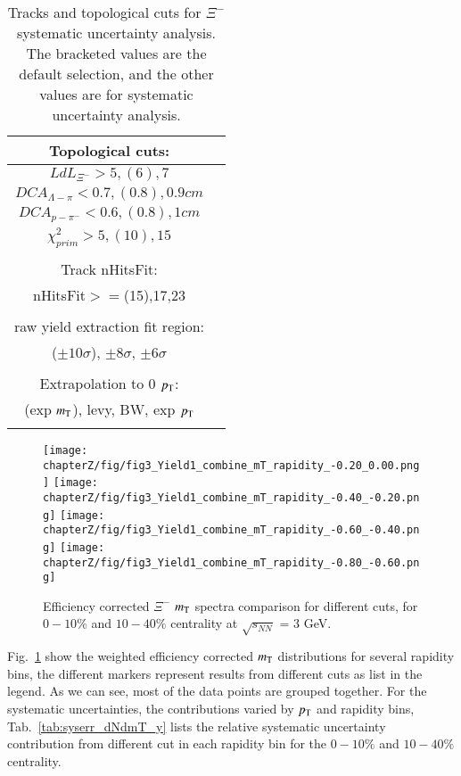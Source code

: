 \begin{table}
\caption{Tracks and topological cuts for $\Xi^{-}$ systematic uncertainty analysis. The bracketed values are the default selection, and the other values are for systematic uncertainty analysis.}
\label{tab:sysCuts}
\begin{tabular}{|c|c|}
\hline
Topological cuts: \\ \hline
$LdL_{\Xi^-}>5,(6),7$ \\ \hline
$DCA_{\Lambda-\pi}<0.7,(0.8),0.9 cm$ \\ \hline
$DCA_{p-\pi^{-}}<0.6,(0.8),1 cm$ \\ \hline
$\chi^{2}_{prim} >5,(10),15$ \\ \hline 
\\ \hline
Track nHitsFit: \\ \hline
nHitsFit$>=$(15),17,23 \\ \hline
\\ \hline
raw yield extraction fit region: \\ \hline
($\pm 10\sigma$), $\pm 8\sigma$, $\pm 6\sigma$ \\ \hline
\\ \hline
Extrapolation to 0 $p_{\rm T}$: \\ \hline
(exp $m_{\rm T}$), levy, BW, exp $p_{\rm T}$\\ \hline
\\ \hline
\end{tabular}
\end{table}


\begin{figure*}[hbt!]
\texttt{[image: chapterZ/fig/fig3\_Yield1\_combine\_mT\_rapidity\_-0.20\_0.00.png]}
\texttt{[image: chapterZ/fig/fig3\_Yield1\_combine\_mT\_rapidity\_-0.40\_-0.20.png]}
\texttt{[image: chapterZ/fig/fig3\_Yield1\_combine\_mT\_rapidity\_-0.60\_-0.40.png]}
\texttt{[image: chapterZ/fig/fig3\_Yield1\_combine\_mT\_rapidity\_-0.80\_-0.60.png]}
\caption{Efficiency corrected $\Xi^{-}$ $m_{\rm T}$ spectra comparison for different cuts, for $0-10\%$ and $10-40\%$ centrality at $\sqrt{s_{NN}}$ = 3 GeV.}
\label{fig:dNdmT_y}
\end{figure*}
Fig.~\ref{fig:dNdmT_y} show the weighted efficiency corrected $m_{\rm T}$ distributions for several rapidity bins, the different markers represent results from different cuts as list in the legend. As we can see, most of the data points are grouped together. For the systematic uncertainties, the contributions varied by $p_{\rm T}$ and rapidity bins, Tab.~\ref{tab:syserr_dNdmT_y} lists the relative systematic uncertainty contribution from different cut in each rapidity bin for the $0-10\%$ and $10-40\%$ centrality.

